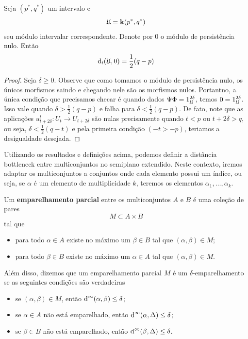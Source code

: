 \begin{propo}\label{teo:semint_eq}
    Seja $(p^*, q^*)$ um intervalo e 
    \begin{equation*}
        \mathfrak{U} = \mathbf{k}(p^*, q^*)
    \end{equation*}
    seu módulo intervalar correspondente. Denote por $0$ o módulo de persistência
    nulo. Então
    \begin{equation*}
        \text{d}_i(\mathfrak{U}, 0) = \frac{1}{2}(q-p)
    \end{equation*}
\end{propo}
\begin{proof}
    Seja $\delta \geq 0$. Observe que como tomamos o módulo de persistência nulo, os únicos
    morfismos saindo e chegando nele são os morfismos nulos. Portantno, a única condição
    que precisamos checar é quando dados $\Psi\Phi = 1^{2\delta}_{\mathfrak{U}}$, temos 
    $0 = 1^{2\delta}_{\mathfrak{U}}$. Isso vale quando $\delta > \frac{1}{2} (q-p)$ e falha 
    para $\delta < \frac{1}{2}(q-p)$. De fato, note que as aplicações $u^t_{t+2\delta} \colon
    U_t \to U_{t+2\delta}$ são nulas precisamente quando $t < p$ ou $t + 2\delta > q$, ou seja,
    $\delta < \frac{1}{2}(q-t)$ e pela primeira condição $(-t > -p)$, teriamos a desigualdade desejada. 
\end{proof}

Utilizando os resultados e definições acima, podemos definir a distância bottleneck entre 
multiconjuntos no semiplano extendido. Neste contexto, iremos adaptar os multiconjuntos 
a conjuntos onde cada elemento possui um índice, ou seja, se $\alpha$ é um elemento de 
multiplicidade $k$, teremos os elementos $\alpha_1, \dots, \alpha_k$. 

\begin{defi}
    Um \textbf{emparelhamento parcial} entre os multiconjuntos $A$ e $B$ é uma coleção de pares
    \begin{equation*}
        M \subset A \times B
    \end{equation*}
    tal que
    \begin{itemize}
        \item para todo $\alpha \in A$ existe no máximo um $\beta \in B$ tal que $(\alpha, \beta)
        \in M$;
        \item para todo $\beta \in B$ existe no máximo um $\alpha \in A$ tal que 
        $(\alpha, \beta) \in M$.
    \end{itemize}
    Além disso, dizemos que um emparelhamento parcial $M$ é um $\delta$-emparelhamento se 
    as seguintes condições são verdadeiras
    \begin{itemize}
        \item se $(\alpha, \beta) \in M$, então $\text{d}^\infty(\alpha, \beta) \leq \delta$; 
        \item se $\alpha \in A$ não está emparelhado, então $\text{d}^\infty(\alpha, \Delta) \leq \delta$;
        \item se $\beta \in B$ não está emparelhado, então $\text{d}^\infty(\beta, \Delta) \leq \delta$.
    \end{itemize}
\end{defi}

